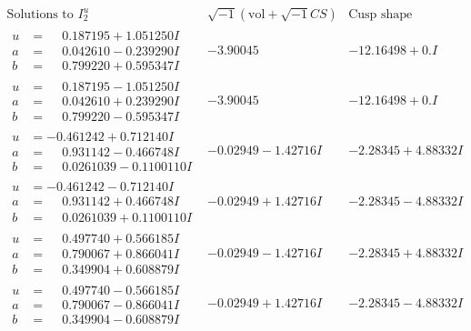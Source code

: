 \documentclass[1p]{elsarticle_modified}
\theoremstyle{definition}
\newcommand{\I}{\sqrt{-1}}
\begin{document}
$$\begin{array}{c|c|c}  
\text{Solutions to }I^u_{2}& \I (\text{vol} + \sqrt{-1}CS) & \text{Cusp shape}\\
 \hline 
\begin{aligned}
u &= \phantom{-}0.187195 + 1.051250 I \\
a &= \phantom{-}0.042610 - 0.239290 I \\
b &= \phantom{-}0.799220 + 0.595347 I\end{aligned}
 & -3.90045\phantom{ +0.000000I} & -12.16498 + 0. I\phantom{ +0.000000I} \\ \hline\begin{aligned}
u &= \phantom{-}0.187195 - 1.051250 I \\
a &= \phantom{-}0.042610 + 0.239290 I \\
b &= \phantom{-}0.799220 - 0.595347 I\end{aligned}
 & -3.90045\phantom{ +0.000000I} & -12.16498 + 0. I\phantom{ +0.000000I} \\ \hline\begin{aligned}
u &= -0.461242 + 0.712140 I \\
a &= \phantom{-}0.931142 - 0.466748 I \\
b &= \phantom{-}0.0261039 - 0.1100110 I\end{aligned}
 & -0.02949 - 1.42716 I & -2.28345 + 4.88332 I \\ \hline\begin{aligned}
u &= -0.461242 - 0.712140 I \\
a &= \phantom{-}0.931142 + 0.466748 I \\
b &= \phantom{-}0.0261039 + 0.1100110 I\end{aligned}
 & -0.02949 + 1.42716 I & -2.28345 - 4.88332 I \\ \hline\begin{aligned}
u &= \phantom{-}0.497740 + 0.566185 I \\
a &= \phantom{-}0.790067 + 0.866041 I \\
b &= \phantom{-}0.349904 + 0.608879 I\end{aligned}
 & -0.02949 - 1.42716 I & -2.28345 + 4.88332 I \\ \hline\begin{aligned}
u &= \phantom{-}0.497740 - 0.566185 I \\
a &= \phantom{-}0.790067 - 0.866041 I \\
b &= \phantom{-}0.349904 - 0.608879 I\end{aligned}
 & -0.02949 + 1.42716 I & -2.28345 - 4.88332 I \\ \hline\begin{aligned}

\end{aligned}
\end{array}$$
\end{document}

